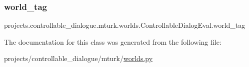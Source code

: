 \subsubsection{\texorpdfstring{world\+\_\+tag}{world\_tag}}
{\footnotesize\ttfamily projects.\+controllable\+\_\+dialogue.\+mturk.\+worlds.\+Controllable\+Dialog\+Eval.\+world\+\_\+tag}



The documentation for this class was generated from the following file\+:\begin{DoxyCompactItemize}
\item 
projects/controllable\+\_\+dialogue/mturk/\hyperlink{projects_2controllable__dialogue_2mturk_2worlds_8py}{worlds.\+py}\end{DoxyCompactItemize}
